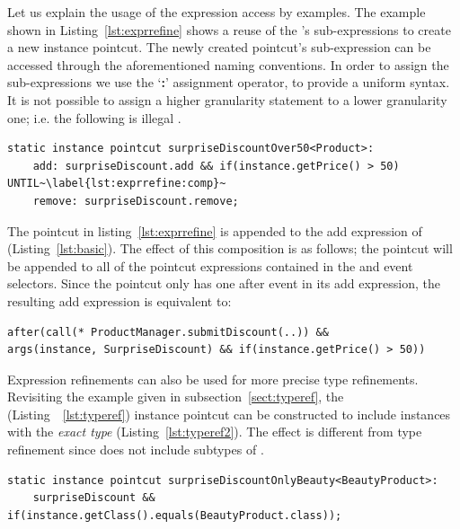 Let us explain the usage of the expression access by examples. The example shown in Listing~\ref{lst:exprrefine} shows a reuse of the 's sub-expressions to create a new instance pointcut. The newly created pointcut's sub-expression can be accessed through the aforementioned naming conventions. In order to assign the sub-expressions we use the `\textbf{\textsf{:}}' assignment operator, to provide a uniform syntax.  It is not possible to assign a higher granularity statement to a lower granularity one; i.e. the following is illegal .

\begin{lstlisting}[float=h!, caption={Expression refinement of \lstinln{surpriseDiscount}(Listing~\ref{lst:basic}) instance pointcut}, label={lst:exprrefine}]
static instance pointcut surpriseDiscountOver50<Product>:
	add: surpriseDiscount.add && if(instance.getPrice() > 50) UNTIL~\label{lst:exprrefine:comp}~
    remove: surpriseDiscount.remove;
\end{lstlisting}


The  pointcut in listing~\ref{lst:exprrefine} is appended to the add expression of  (Listing~\ref{lst:basic}). The effect of this composition is  as follows; the  pointcut will be appended to all of the pointcut expressions contained in the  and  event selectors. Since the   pointcut only has one after event in its add expression, the resulting add expression is equivalent to:

\begin{lstlisting}[numbers=none]
after(call(* ProductManager.submitDiscount(..)) &&
args(instance, SurpriseDiscount) && if(instance.getPrice() > 50))
\end{lstlisting}

Expression refinements can also be used for more precise type refinements. Revisiting the example given in subsection~\ref{sect:typeref}, the  (Listing~~\ref{lst:typeref}) instance pointcut can be constructed to include instances with the \emph{exact type} (Listing~\ref{lst:typeref2}). The effect is different from type refinement since  does not include subtypes of .

\begin{lstlisting}[float=h!,caption={Type refinement by expression refinement}, label={lst:typeref2}]
static instance pointcut surpriseDiscountOnlyBeauty<BeautyProduct>:
	surpriseDiscount && if(instance.getClass().equals(BeautyProduct.class));
\end{lstlisting}


